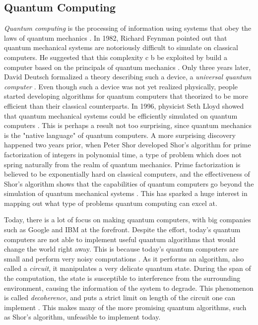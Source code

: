 \subsection{Quantum Computing}\label{sec:Quantum Computing Intro}
\emph{Quantum computing} is the processing of information using systems that obey the laws of quantum mechanics \cite{NielsenQuantum}. In 1982, Richard Feynman pointed out that quantum mechanical systems are notoriously difficult to simulate on classical computers. He suggested that this complexity c b be exploited by build a computer based on the principals of quantum mechanics \cite{NielsenQuantum}. Only three years later, David Deutsch formalized a theory describing such a device, a \emph{universal quantum computer} \cite{Deutsch1985QuantumTT}. Even though such a device was not yet realized physically, people started developing algorithms for quantum computers that theorized to be more efficient than their classical counterparts. In 1996, physicist Seth Lloyd showed that quantum mechanical systems could be efficiently simulated on quantum computers \cite{Lloyd1073}. This is perhaps a result not too surprising, since quantum mechanics is the "native language" of quantum computers. A more surprising discovery happened two years prior, when Peter Shor developed Shor's algorithm for prime factorization of integers in polynomial time, a type of problem which does not spring naturally from the realm of quantum mechanics. Prime factorization is believed to be exponentially hard on classical computers, and the effectiveness of Shor's algorithm shows that the capabilities of quantum computers go beyond the simulation of quantum mechanical systems \cite{Shor_1997}.
This has sparked a huge interest in mapping out what type of problems quantum computing can excel at. 


Today, there is a lot of focus on making quantum computers, with big companies such as Google and IBM at the forefront. Despite the effort, today's quantum computers are not able to implement useful quantum algorithms that would change the world right away. This is because today's quantum computers are small and perform very noisy computations \cite{Preskill_2018}. As it performs an algorithm, also called a \emph{circuit}, it manipulates a very delicate quantum state. During the span of the computation, the state is susceptible to interference from the surrounding environment, causing the information of the system to degrade. This phenomenon is called \emph{decoherence}, and puts a strict limit on length of the circuit one can implement \cite{saki2019study}. This makes many of the more promising quantum algorithms, such as Shor's algorithm, unfeasible to implement today.


